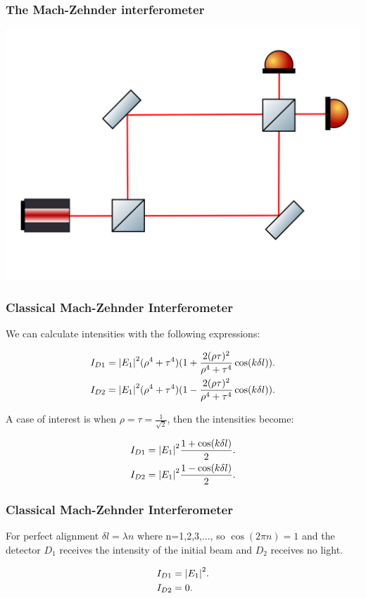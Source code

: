 \documentclass[]{beamer}
\begin{document}
\begin{frame}
\frametitle{The Mach-Zehnder interferometer}
\includegraphics[width=\textwidth]{images/machzenhder.png}
\end{frame}
\begin{frame}
\frametitle{Classical Mach-Zehnder Interferometer}

We can calculate intensities with the following expressions:

\begin{align*}
I_{D1}=\abs{E_{1}}^2 (\rho^4 +\tau^4)(1+\frac{2 (\rho \tau)^2}{\rho^4+\tau^4}\cos(k\delta l)).\\
I_{D2}=\abs{E_{1}}^2 (\rho^4 +\tau^4)(1-\frac{2 (\rho \tau)^2}{\rho^4+\tau^4}\cos(k\delta l)).
\end{align*}

A case of interest is when $\rho=\tau=\frac{1}{\sqrt{2}}$, then the intensities become:

\begin{align*}
I_{D1}=\abs{E_{1}}^2 \frac{1+\cos(k \delta l)}{2}. \\
I_{D2}=\abs{E_{1}}^2 \frac{1-\cos(k \delta l)}{2}. 
\end{align*}


\end{frame}
\begin{frame}
\frametitle{Classical Mach-Zehnder Interferometer}


 
 For perfect alignment  $\delta l=\lambda n$ where n=1,2,3,..., so $\cos(2 \pi n )=1$ and the detector $D_{1}$ receives the intensity of the initial beam and $D_{2}$ receives no light.
 
\begin{align}
&I_{D1}=\abs{E_{1}}^2.\\
&I_{D2}=0.
\end{align}

\end{frame}
\end{document}
